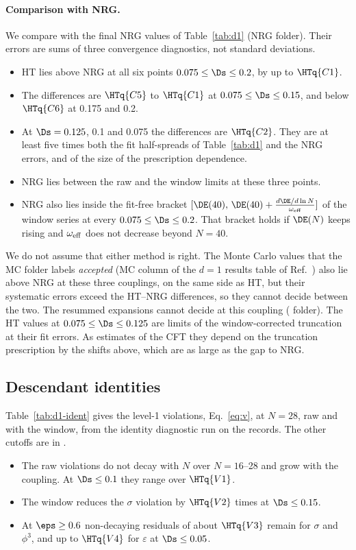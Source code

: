 \paragraph{Comparison with NRG.} We compare with the final NRG values of Table~\ref{tab:d1} (NRG folder). Their
errors are sums of three convergence diagnostics, not standard deviations.
\begin{itemize}
\item HT lies above NRG at all six points $0.075\le\Ds\le0.2$, by up to $\HTq{C1}$.
\item The differences are $\HTq{C5}$ to $\HTq{C1}$ at $0.075\le\Ds\le0.15$, and below $\HTq{C6}$ at 0.175 and 0.2.
\item At $\Ds=0.125$, 0.1 and 0.075 the differences are $\HTq{C2}$. They are at least five times both the fit
 half-spreads of Table~\ref{tab:d1} and the NRG errors, and of the size of the prescription dependence.
\item NRG lies between the raw and the window limits at these three points.
\item NRG also lies inside the fit-free bracket $[\DE(40),\,\DE(40)+\frac{d\DE/d\ln N}{\omega_{\rm eff}}]$ of the
 window series at every $0.075\le\Ds\le0.2$. That bracket holds if $\DE(N)$ keeps rising and $\omega_{\rm eff}$
 does not decrease beyond $N=40$.
\end{itemize}
We do not assume that either method is right. The Monte Carlo values that the MC folder labels \emph{accepted}
(MC column of the $d=1$ results table of Ref.~\cite{paper}) also lie above NRG at these three couplings, on the same side as HT, but their
systematic errors exceed the HT--NRG differences, so they cannot decide between the two. The resummed expansions cannot decide at this coupling
( folder). The HT values at
$0.075\le\Ds\le0.125$ are limits of the window-corrected truncation at their fit errors. As estimates of the CFT
they depend on the truncation prescription by the shifts above, which are as large as the gap to NRG.

\subsection{Descendant identities}\label{sec:d1-ident}
Table~\ref{tab:d1-ident} gives the level-1 violations, Eq.~\eqref{eq:v}, at $N=28$, raw and with the window, from
the identity diagnostic run on the  records. The other cutoffs are in
.
\begin{itemize}
\item The raw violations do not decay with $N$ over $N=16$--28 and grow with the coupling. At $\Ds\le0.1$ they range
 over $\HTq{V1}$.
\item The window reduces the $\sigma$ violation by $\HTq{V2}$ times at $\Ds\le0.15$.
\item At $\eps\ge0.6$ non-decaying residuals of about $\HTq{V3}$ remain for $\sigma$ and $\phi^3$, and up to
 $\HTq{V4}$ for $\varepsilon$ at $\Ds\le0.05$.
\end{itemize}

